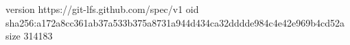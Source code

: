 version https://git-lfs.github.com/spec/v1
oid sha256:a172a8cc361ab37a533b375a8731a944d434ca32dddde984c4e42e969b4cd52a
size 314183

